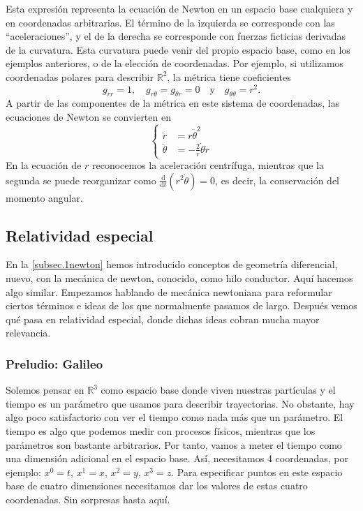 Esta expresión representa la ecuación de Newton en un espacio base cualquiera y en coordenadas arbitrarias. El término de la izquierda se corresponde con las ``aceleraciones'', y el de la derecha se corresponde con fuerzas ficticias derivadas de la curvatura. Esta curvatura puede venir del propio espacio base, como en los ejemplos anteriores, o de la elección de coordenadas. Por ejemplo, si utilizamos coordenadas polares para describir \(\mathbb{R}^2\), la métrica tiene coeficientes
\begin{equation}
    g_{rr} = 1,\quad g_{r\theta} = g_{\theta r} = 0\quad\text{y}\quad g_{\theta\theta} = r^2.
\end{equation}
A partir de las componentes de la métrica en este sistema de coordenadas, las ecuaciones de Newton se convierten en 
\begin{equation}
    \left\{\begin{aligned}
        \ddot{r} &= r\dot{\theta}^2\\
        \ddot{\theta} &= -\frac{2}{r}\dot{\theta}\dot{r}
    \end{aligned}\right.
\end{equation}
En la ecuación de \(r\) reconocemos la aceleración centrífuga, mientras que la segunda se puede reorganizar como \(\frac{\mathrm{d}}{\mathrm{d}t}(r^2\dot{\theta}) = 0\), es decir, la conservación del momento angular. 

\subsection{Relatividad especial}
\label{subsec.1relatividad}

En la \cref{subsec.1newton} hemos introducido conceptos de geometría diferencial, nuevo, con la mecánica de newton, conocido, como hilo conductor. Aquí hacemos algo similar. Empezamos hablando de mecánica newtoniana para reformular ciertos términos e ideas de los que normalmente pasamos de largo. Después vemos qué pasa en relatividad especial, donde dichas ideas cobran mucha mayor relevancia.

\subsubsection{Preludio: Galileo}
\label{subsubsec.1galileo}

Solemos pensar en \(\mathbb{R}^3\) como espacio base donde viven nuestras partículas y el tiempo es un parámetro que usamos para describir trayectorias. No obstante, hay algo poco satisfactorio con ver el tiempo como nada más que un parámetro. El tiempo es algo que podemos medir con procesos físicos, mientras que los parámetros son bastante arbitrarios. Por tanto, vamos a meter el tiempo como una dimensión adicional en el espacio base. Así, necesitamos 4 coordenadas, por ejemplo: \(x^0=t\), \(x^1=x\), \(x^2=y\), \(x^3=z\). Para especificar puntos en este espacio base de cuatro dimensiones necesitamos dar los valores de estas cuatro coordenadas. Sin sorpresas hasta aquí.

